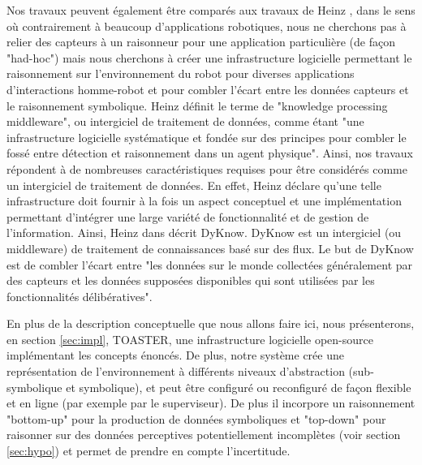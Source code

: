 \documentclass[a4paper,11pt,twoside]{StyleThese}
\begin{document}

Nos travaux peuvent également être comparés aux travaux de Heinz \cite{heintz2009dyknow}, dans le sens où contrairement à beaucoup d'applications robotiques, nous ne cherchons pas à relier des capteurs à un raisonneur pour une application particulière (de façon "had-hoc") mais nous cherchons à créer une infrastructure logicielle permettant le raisonnement sur l'environnement du robot pour diverses applications d'interactions homme-robot et pour combler l'écart entre les données capteurs et le raisonnement symbolique. Heinz définit le terme de "knowledge processing middleware"\cite{heintz2008knowledge}, ou intergiciel de traitement de données, comme étant "une infrastructure logicielle systématique et fondée sur des principes pour combler le fossé entre détection et raisonnement dans un agent physique". Ainsi, nos travaux répondent à de nombreuses caractéristiques requises pour être considérés comme un intergiciel de traitement de données. En effet, Heinz déclare qu'une telle infrastructure doit fournir à la fois un aspect conceptuel et une implémentation permettant d'intégrer une large variété de fonctionnalité et de gestion de l'information. Ainsi, Heinz dans \cite{heintz2010bridging} décrit DyKnow. DyKnow est un intergiciel (ou middleware) de traitement de connaissances basé sur des flux. Le but de DyKnow est de combler l'écart entre "les données sur le monde collectées généralement par des capteurs et les données supposées disponibles qui sont utilisées par les fonctionnalités délibératives".

En plus de la description conceptuelle que nous allons faire ici, nous présenterons, en section \ref{sec:impl}, TOASTER, une infrastructure logicielle open-source implémentant les concepts énoncés. De plus, notre système crée une représentation de l'environnement à différents niveaux d'abstraction (sub-symbolique et symbolique), et peut être configuré ou reconfiguré de façon flexible et en ligne (par exemple par le superviseur). De plus il incorpore un raisonnement "bottom-up" pour la production de données symboliques et "top-down" pour raisonner sur des données perceptives potentiellement incomplètes (voir section \ref{sec:hypo}) et permet de prendre en compte l'incertitude.
\end{document}
